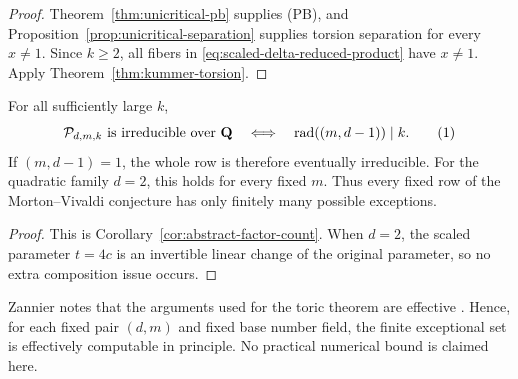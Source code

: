 \begin{proof}
Theorem~\ref{thm:unicritical-pb} supplies (PB), and
Proposition~\ref{prop:unicritical-separation} supplies torsion
separation for every $x\ne1$.  Since $k\ge2$, all fibers in
\eqref{eq:scaled-delta-reduced-product} have $x\ne1$.  Apply
Theorem~\ref{thm:kummer-torsion}.
\end{proof}

\begin{corollary}
\label{cor:unicritical-eventual-criterion}
For all sufficiently large $k$,
\[
 \mathcal P_{d,m,k}\text{ is irreducible over }\Q
 \quad\Longleftrightarrow\quad
 \operatorname{rad}((m,d-1))\mid k.
 \numberthis\label{eq:unicritical-radical-criterion}
\]
If $(m,d-1)=1$, the whole row is therefore eventually irreducible.
For the quadratic family $d=2$, this holds for every fixed $m$.
Thus every fixed row of the Morton--Vivaldi conjecture has only
finitely many possible exceptions.
\end{corollary}

\begin{proof}
This is Corollary~\ref{cor:abstract-factor-count}.  When $d=2$, the
scaled parameter $t=4c$ is an invertible linear change of the original
parameter, so no extra composition issue occurs.
\end{proof}

\begin{remark}[Effectivity]
Zannier notes that the arguments used for the toric theorem are
effective \cite[p.~400]{Zannier2010}.  Hence, for each fixed pair
$(d,m)$ and fixed base number field, the finite exceptional set is
effectively computable in principle.  No practical numerical bound is
claimed here.
\end{remark}
